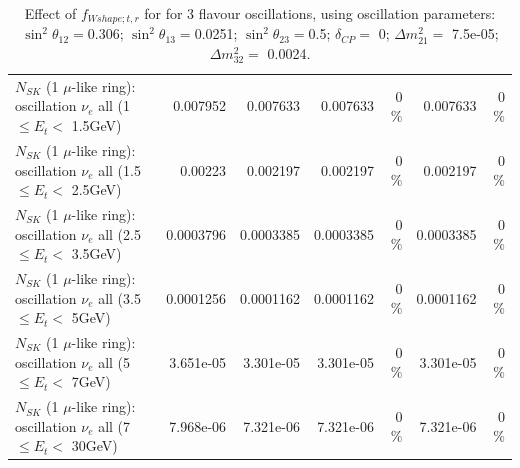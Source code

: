 \begin{table}
\begin{tabular}{| l | r | r | r  r | r  r |}
$N_{SK}$ (1 $\mu$-like ring): oscillation $\nu_{e}$ all (1 $\leq E_{t} <$ 1.5GeV) &        0.007952 &        0.007633 &        0.007633 &        0 \%  &        0.007633 &        0 \%  \\ 
$N_{SK}$ (1 $\mu$-like ring): oscillation $\nu_{e}$ all (1.5 $\leq E_{t} <$ 2.5GeV) &         0.00223 &        0.002197 &        0.002197 &        0 \%  &        0.002197 &        0 \%  \\ 
$N_{SK}$ (1 $\mu$-like ring): oscillation $\nu_{e}$ all (2.5 $\leq E_{t} <$ 3.5GeV) &       0.0003796 &       0.0003385 &       0.0003385 &        0 \%  &       0.0003385 &        0 \%  \\ 
$N_{SK}$ (1 $\mu$-like ring): oscillation $\nu_{e}$ all (3.5 $\leq E_{t} <$ 5GeV) &       0.0001256 &       0.0001162 &       0.0001162 &        0 \%  &       0.0001162 &        0 \%  \\ 
 $N_{SK}$ (1 $\mu$-like ring): oscillation $\nu_{e}$ all (5 $\leq E_{t} <$ 7GeV) &       3.651e-05 &       3.301e-05 &       3.301e-05 &        0 \%  &       3.301e-05 &        0 \%  \\ 
$N_{SK}$ (1 $\mu$-like ring): oscillation $\nu_{e}$ all (7 $\leq E_{t} <$ 30GeV) &       7.968e-06 &       7.321e-06 &       7.321e-06 &        0 \%  &       7.321e-06 &        0 \%  \\ 
\hline
\hline
\end{tabular}
\caption{ Effect of $f_{Wshape; t, r}$ for for 3 flavour oscillations, using oscillation parameters:  $\sin^2\theta_{12} = $0.306; $\sin^2\theta_{13} = $0.0251; $\sin^2\theta_{23} = $0.5; $\delta_{CP} = $        0; $\Delta m^2_{21} = $    7.5e-05; $\Delta m^2_{32} = $    0.0024. }
\label{tab:num_xsec_wshape_1RmuT_3f_osc_t13:0.0251}
\end{table}
\clearpage
